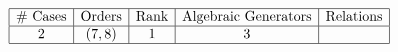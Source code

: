 \begin{table}[h]
	\centering
	$\begin{array}{|c|c|c|c|c|}
		\hline
		\text{\# Cases} & \text{Orders} & \text{Rank} & \text{Algebraic Generators} & \text{Relations} \\
		\hline
		2 & (7, 8) & 1 & 3 &  \\
		\hline
	\end{array}$
\end{table}
